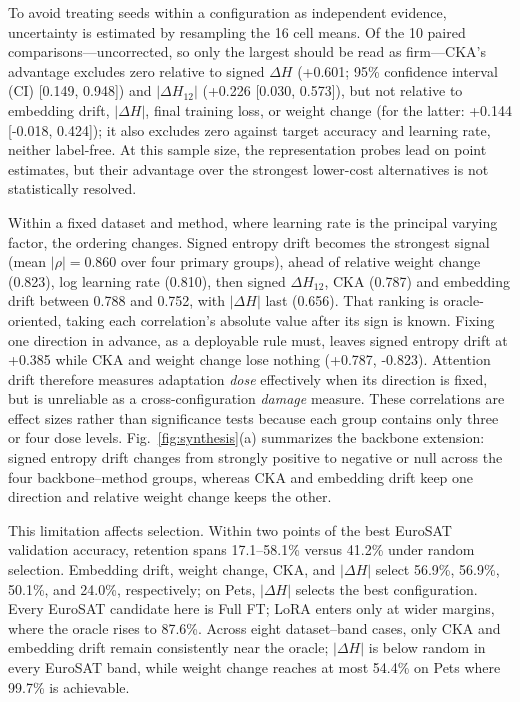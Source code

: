 \documentclass[conference]{IEEEtran}
\begin{document}
To avoid treating seeds within a configuration as independent evidence, uncertainty is estimated by resampling the 16 cell means. Of the 10 paired comparisons---uncorrected, so only the largest should be read as firm---CKA's advantage excludes zero relative to signed $\Delta H$ (+0.601; 95\% confidence interval (CI) [0.149, 0.948]) and $|\Delta H_{12}|$ (+0.226 [0.030, 0.573]), but not relative to embedding drift, $|\Delta H|$, final training loss, or weight change (for the latter: +0.144 [-0.018, 0.424]); it also excludes zero against target accuracy and learning rate, neither label-free. At this sample size, the representation probes lead on point estimates, but their advantage over the strongest lower-cost alternatives is not statistically resolved.

Within a fixed dataset and method, where learning rate is the principal varying factor, the ordering changes. Signed entropy drift becomes the strongest signal (mean $|\rho|=0.860$ over four primary groups), ahead of relative weight change (0.823), log learning rate (0.810), then signed $\Delta H_{12}$, CKA (0.787) and embedding drift between 0.788 and 0.752, with $|\Delta H|$ last (0.656). That ranking is oracle-oriented, taking each correlation's absolute value after its sign is known. Fixing one direction in advance, as a deployable rule must, leaves signed entropy drift at +0.385 while CKA and weight change lose nothing (+0.787, -0.823). Attention drift therefore measures adaptation \emph{dose} effectively when its direction is fixed, but is unreliable as a cross-configuration \emph{damage} measure. These correlations are effect sizes rather than significance tests because each group contains only three or four dose levels. Fig.~\ref{fig:synthesis}(a) summarizes the backbone extension: signed entropy drift changes from strongly positive to negative or null across the four backbone--method groups, whereas CKA and embedding drift keep one direction and relative weight change keeps the other.

This limitation affects selection. Within two points of the best EuroSAT validation accuracy, retention spans 17.1--58.1\% versus 41.2\% under random selection. Embedding drift, weight change, CKA, and $|\Delta H|$ select 56.9\%, 56.9\%, 50.1\%, and 24.0\%, respectively; on Pets, $|\Delta H|$ selects the best configuration. Every EuroSAT candidate here is Full FT; LoRA enters only at wider margins, where the oracle rises to 87.6\%. Across eight dataset--band cases, only CKA and embedding drift remain consistently near the oracle; $|\Delta H|$ is below random in every EuroSAT band, while weight change reaches at most 54.4\% on Pets where 99.7\% is achievable.
\end{document}
